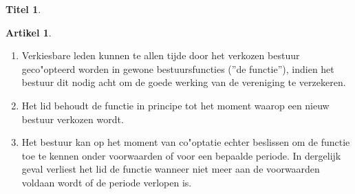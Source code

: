 \documentclass[a4paper,10pt]{article}
\theoremstyle{definition}
\newtheorem{titel}{\newline\Large Titel}
\newtheorem{artikelbase}{\large Artikel}
\newenvironment{artikel}
  {\begin{artikelbase}}
  {\smallskip
   \end{artikelbase}}
\newcommand{\ttextenum}{\mbox{}}
\begin{document}
\begin{titel}
  \begin{artikel}\label{bestuur-cooptatie}\ttextenum
    \begin{enumerate}
      \item
        Verkiesbare leden kunnen te allen tijde door het verkozen bestuur geco"opteerd worden in gewone bestuursfuncties (''de functie''), indien het bestuur dit nodig acht om de goede werking van de vereniging te verzekeren.
      \item
        Het lid behoudt de functie in principe tot het moment waarop een nieuw bestuur verkozen wordt.
      \item
        Het bestuur kan op het moment van co"optatie echter beslissen om de functie toe te kennen onder voorwaarden of voor een bepaalde periode.
        In dergelijk geval verliest het lid de functie wanneer niet meer aan de voorwaarden voldaan wordt of de periode verlopen is.
    \end{enumerate}
  \end{artikel}

\end{titel}
\end{document}
